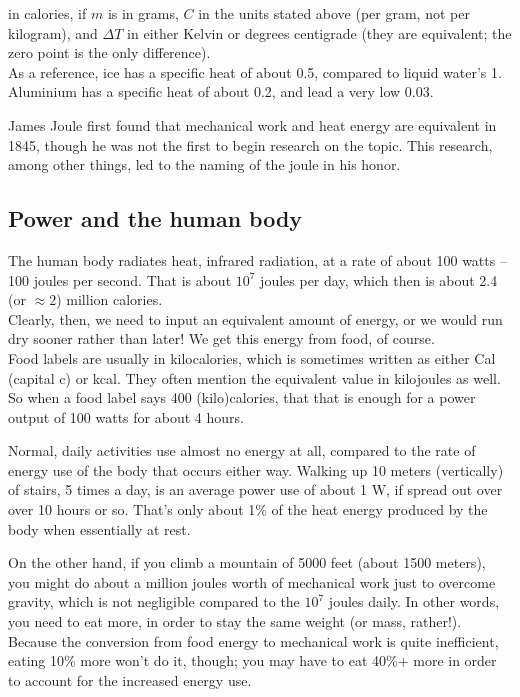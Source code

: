 \documentclass[8.01x]{subfiles}
\begin{document}
in calories, if $m$ is in grams, $C$ in the units stated above (per gram, not per kilogram), and $\Delta T$ in either Kelvin or degrees centigrade (they are equivalent; the zero point is the only difference).\\
As a reference, ice has a specific heat of about 0.5, compared to liquid water's 1. Aluminium has a specific heat of about 0.2, and lead a very low 0.03.

James Joule first found that mechanical work and heat energy are equivalent in 1845, though he was not the first to begin research on the topic. This research, among other things, led to the naming of the joule in his honor.

\subsection{Power and the human body}

The human body radiates heat, infrared radiation, at a rate of about 100 watts -- 100 joules per second. That is about $10^7$ joules per day, which then is about 2.4 (or $\approx 2$) million calories.\\
Clearly, then, we need to input an equivalent amount of energy, or we would run dry sooner rather than later! We get this energy from food, of course.\\
Food labels are usually in kilocalories, which is sometimes written as either Cal (capital c) or kcal. They often mention the equivalent value in kilojoules as well.\\
So when a food label says 400 (kilo)calories, that that is enough for a power output of 100 watts for about 4 hours.

Normal, daily activities use almost no energy at all, compared to the rate of energy use of the body that occurs either way. Walking up 10 meters (vertically) of stairs, 5 times a day, is an average power use of about 1 W, if spread out over over 10 hours or so. That's only about 1\% of the heat energy produced by the body when essentially at rest.

On the other hand, if you climb a mountain of 5000 feet (about 1500 meters), you might do about a million joules worth of mechanical work just to overcome gravity, which is not negligible compared to the $10^7$ joules daily. In other words, you need to eat more, in order to stay the same weight (or mass, rather!).\\
Because the conversion from food energy to mechanical work is quite inefficient, eating 10\% more won't do it, though; you may have to eat 40\%+ more in order to account for the increased energy use.
\end{document}
